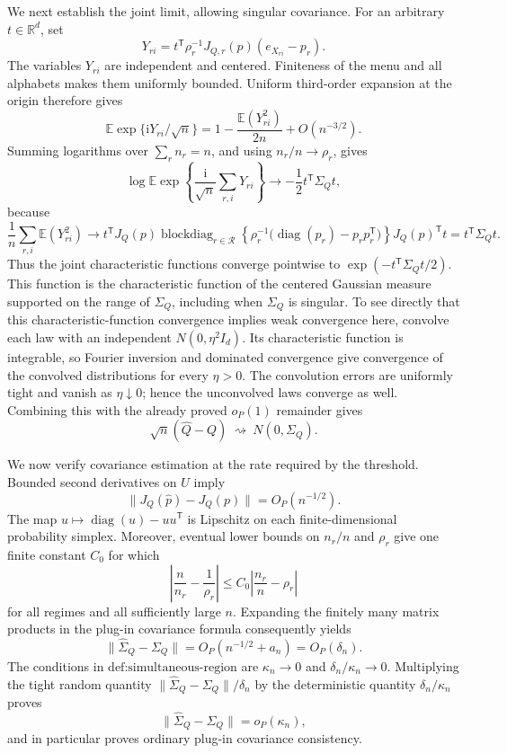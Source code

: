 We next establish the joint limit, allowing singular covariance.  For an arbitrary \(t\in\mathbb R^d\), set
\[
 Y_{ri}=t^{\mathsf T}\rho_r^{-1}J_{Q,r}(p)(e_{X_{ri}}-p_r).
\]
The variables \(Y_{ri}\) are independent and centered.  Finiteness of the menu and all alphabets makes them uniformly bounded.  Uniform third-order expansion at the origin therefore gives
\[
 \mathbb E\exp\{\mathrm iY_{ri}/\sqrt n\}
 =1-\frac{\mathbb E(Y_{ri}^2)}{2n}+O(n^{-3/2}).
\]
Summing logarithms over \(\sum_r n_r=n\), and using \(n_r/n\to\rho_r\), gives
\[
 \log\mathbb E\exp\!\left\{
   \frac{\mathrm i}{\sqrt n}\sum_{r,i}Y_{ri}\right\}
 \longrightarrow-\frac12t^{\mathsf T}\Sigma_Qt,
\]
because
\[
 \frac1n\sum_{r,i}\mathbb E(Y_{ri}^2)
 \longrightarrow
 t^{\mathsf T}J_Q(p)
 \operatorname{blockdiag}_{r\in\mathcal R}
 \left\{\rho_r^{-1}
 \bigl(\operatorname{diag}(p_r)-p_rp_r^{\mathsf T}\bigr)\right\}
 J_Q(p)^{\mathsf T}t
 =t^{\mathsf T}\Sigma_Qt.
\]
Thus the joint characteristic functions converge pointwise to \(\exp(-t^{\mathsf T}\Sigma_Qt/2)\).  This function is the characteristic function of the centered Gaussian measure supported on the range of \(\Sigma_Q\), including when \(\Sigma_Q\) is singular.  To see directly that this characteristic-function convergence implies weak convergence here, convolve each law with an independent \(N(0,\eta^2I_d)\).  Its characteristic function is integrable, so Fourier inversion and dominated convergence give convergence of the convolved distributions for every \(\eta>0\).  The convolution errors are uniformly tight and vanish as \(\eta\downarrow0\); hence the unconvolved laws converge as well.  Combining this with the already proved \(o_P(1)\) remainder gives
\[
 \sqrt n(\widehat Q-Q)\ \rightsquigarrow\ N(0,\Sigma_Q).
\]

We now verify covariance estimation at the rate required by the threshold.  Bounded second derivatives on \(U\) imply
\[
 \lVert J_Q(\widehat p)-J_Q(p)\rVert=O_P(n^{-1/2}).
\]
The map \(u\mapsto\operatorname{diag}(u)-uu^{\mathsf T}\) is Lipschitz on each finite-dimensional probability simplex.  Moreover, eventual lower bounds on \(n_r/n\) and \(\rho_r\) give one finite constant \(C_0\) for which
\[
 \left|\frac n{n_r}-\frac1{\rho_r}\right|
 \le C_0\left|\frac{n_r}{n}-\rho_r\right|
\]
for all regimes and all sufficiently large \(n\).  Expanding the finitely many matrix products in the plug-in covariance formula consequently yields
\[
 \lVert\widehat\Sigma_Q-\Sigma_Q\rVert
 =O_P(n^{-1/2}+a_n)=O_P(\delta_n).
\]
The conditions in \(\text{def:simultaneous-region}\) are \(\kappa_n\to0\) and \(\delta_n/\kappa_n\to0\).  Multiplying the tight random quantity \(\lVert\widehat\Sigma_Q-\Sigma_Q\rVert/\delta_n\) by the deterministic quantity \(\delta_n/\kappa_n\) proves
\[
 \lVert\widehat\Sigma_Q-\Sigma_Q\rVert=o_P(\kappa_n),
\]
and in particular proves ordinary plug-in covariance consistency.

